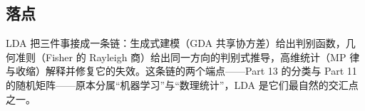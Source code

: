 \subsection{落点}

LDA 把三件事接成一条链：生成式建模（GDA 共享协方差）给出判别函数，几何准则（Fisher 的 Rayleigh 商）给出同一方向的判别式推导，高维统计（MP 律与收缩）解释并修复它的失效。这条链的两个端点——Part 13 的分类与 Part 11 的随机矩阵——原本分属``机器学习''与``数理统计''，LDA 是它们最自然的交汇点之一。
